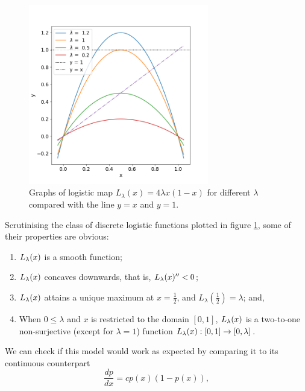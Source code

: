 \begin{figure}[t]
	\centering
	\includegraphics[width=0.7\textwidth]{./figures/logistic_map_diff_lambda.png}
	\caption{Graphs of logistic map $L_{\lambda}(x) = 4 \lambda x(1-x)$ for different $\lambda$ compared with the line $y=x$ and $y = 1$.} 
	\label{fig:logistic_map_diff_lambda}
\end{figure}


Scrutinising the class of discrete logistic functions plotted in figure \ref{fig:logistic_map_diff_lambda}, some of their properties are obvious:

\begin{enumerate}
	\item $L_{\lambda}(x)$ is a smooth function;
	\item $L_{\lambda}(x)$ concaves downwards, that is, $L_{\lambda}(x)'' < 0$;
	\item $L_{\lambda}(x)$ attains a unique maximum at $x = \frac{1}{2}$, and $L_{\lambda}(\frac{1}{2}) = \lambda$; and,
	\item When $0 \leq \lambda$ and $x$ is restricted to the domain $[0, 1]$, $L_{\lambda}(x)$ is a two-to-one non-surjective (except for $\lambda = 1$) function $L_{\lambda}(x): [0,1] \rightarrow [0,\lambda]$. 
\end{enumerate}


We can check if this model would work as expected by comparing it to its continuous counterpart 
\begin{equation}\label{eq_logistic_continuous}
	\frac{dp}{dx} = c p(x) (1-p(x)),
\end{equation}

